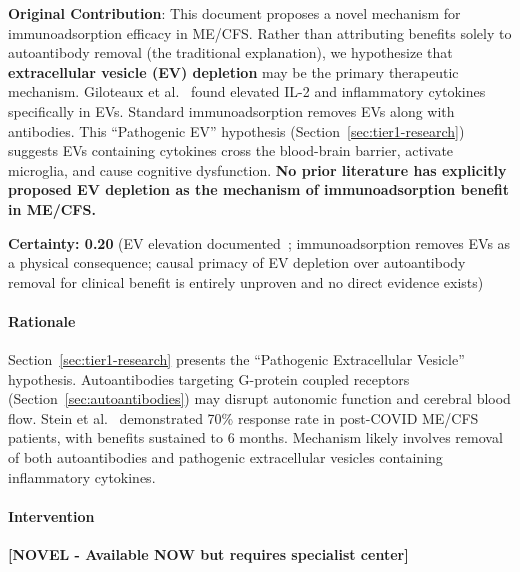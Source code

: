 \begin{speculation}
\label{spec:ev-depletion-immunoadsorption}
\textbf{Original Contribution}: This document proposes a novel mechanism for immunoadsorption efficacy in ME/CFS. Rather than attributing benefits solely to autoantibody removal (the traditional explanation), we hypothesize that \textbf{extracellular vesicle (EV) depletion} may be the primary therapeutic mechanism. Giloteaux et al.~\cite{Giloteaux2023} found elevated IL-2 and inflammatory cytokines specifically in EVs. Standard immunoadsorption removes EVs along with antibodies. This ``Pathogenic EV'' hypothesis (Section~\ref{sec:tier1-research}) suggests EVs containing cytokines cross the blood-brain barrier, activate microglia, and cause cognitive dysfunction. \textbf{No prior literature has explicitly proposed EV depletion as the mechanism of immunoadsorption benefit in ME/CFS.}

\textbf{Certainty: 0.20} (EV elevation documented~\cite{Giloteaux2023}; immunoadsorption removes EVs as a physical consequence; causal primacy of EV depletion over autoantibody removal for clinical benefit is entirely unproven and no direct evidence exists)
\end{speculation}

\paragraph{Rationale}
Section~\ref{sec:tier1-research} presents the ``Pathogenic Extracellular Vesicle'' hypothesis. Autoantibodies targeting G-protein coupled receptors (Section~\ref{sec:autoantibodies}) may disrupt autonomic function and cerebral blood flow. Stein et al.~\cite{Stein2024immunoadsorption} demonstrated 70\% response rate in post-COVID ME/CFS patients, with benefits sustained to 6 months. Mechanism likely involves removal of both autoantibodies and pathogenic extracellular vesicles containing inflammatory cytokines.

\paragraph{Intervention}

\textbf{[NOVEL - Available NOW but requires specialist center]}

